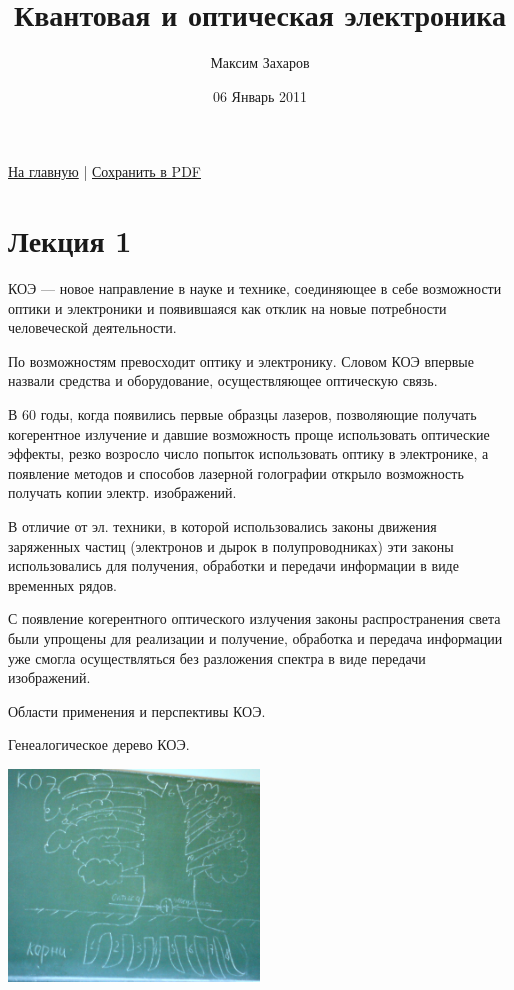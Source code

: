 \documentclass[12pt, russian, oneside, article]{ncc}
\begin{document}
\title{Квантовая и оптическая электроника}
\author{Максим Захаров}
\date{06 Январь 2011}
\maketitle

\setcounter{tocdepth}{3}
\tableofcontents
\vspace*{1cm}


\href{file:///home/maxim/Documents/Git/lectures/index.org}{На главную} | \href{file:///home/maxim/Documents/Git/lectures/other/KOE_Lectures.pdf}{Сохранить в PDF}

\section{Лекция 1}
\label{sec-1}


КОЭ --- новое направление в науке и технике, соединяющее в себе возможности оптики и электроники и появившаяся как отклик на новые потребности человеческой деятельности.

По возможностям превосходит оптику и электронику. Словом КОЭ впервые назвали средства и оборудование, осуществляющее оптическую связь.

В 60 годы, когда появились первые образцы лазеров, позволяющие получать когерентное излучение и давшие возможность проще использовать оптические эффекты, резко возросло число попыток использовать оптику в электронике, а появление методов и способов лазерной голографии открыло возможность получать копии электр. изображений.

В отличие от эл. техники, в которой использовались законы движения заряженных частиц (электронов и дырок в полупроводниках) эти законы использовались для получения, обработки и передачи информации в виде временных рядов.

С появление когерентного оптического излучения законы распространения света были упрощены для реализации и получение, обработка и передача информации уже смогла осуществляться без разложения спектра в виде передачи изображений.

Области применения и перспективы КОЭ. 

Генеалогическое дерево КОЭ.

\includegraphics[width=0.5\textwidth]{images/KOE/tree.png}
\end{document}
